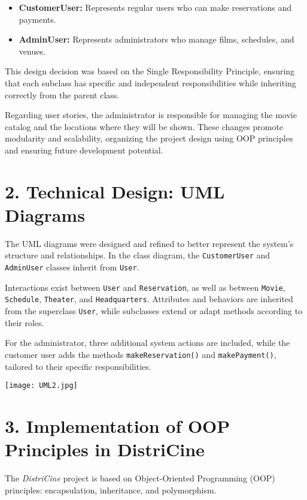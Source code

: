 \documentclass[man]{apa7}
\begin{document}
\begin{itemize}
  \item \textbf{CustomerUser:} Represents regular users who can make reservations and payments.
  \item \textbf{AdminUser:} Represents administrators who manage films, schedules, and venues.
\end{itemize}

This design decision was based on the Single Responsibility Principle, ensuring that each subclass has specific and independent responsibilities while inheriting correctly from the parent class.

Regarding user stories, the administrator is responsible for managing the movie catalog and the locations where they will be shown. These changes promote modularity and scalability, organizing the project design using OOP principles and ensuring future development potential.

\section{2. Technical Design: UML Diagrams}

The UML diagrams were designed and refined to better represent the system's structure and relationships. In the class diagram, the \texttt{CustomerUser} and \texttt{AdminUser} classes inherit from \texttt{User}. 

Interactions exist between \texttt{User} and \texttt{Reservation}, as well as between \texttt{Movie}, \texttt{Schedule}, \texttt{Theater}, and \texttt{Headquarters}. Attributes and behaviors are inherited from the superclass \texttt{User}, while subclasses extend or adapt methods according to their roles.

For the administrator, three additional system actions are included, while the customer user adds the methods \texttt{makeReservation()} and \texttt{makePayment()}, tailored to their specific responsibilities.

\begin{center}
\texttt{[image: UML2.jpg]}
\end{center}

\section{3. Implementation of OOP Principles in DistriCine}

The \textit{DistriCine} project is based on Object-Oriented Programming (OOP) principles: encapsulation, inheritance, and polymorphism.
\end{document}
